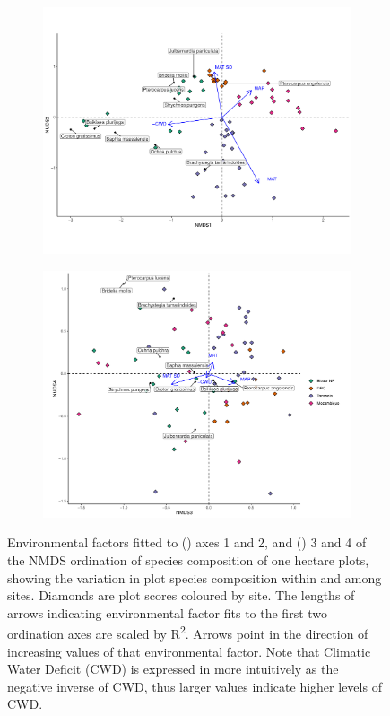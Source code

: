 \begin{refsection}
\begin{figure}
	\begin{subfigure}{0.45\linewidth}
		\includegraphics[width=\linewidth]{img/all_nmds_envfit}
		\caption{}
		\label{bicuar:nmds_envfit_12}
	\end{subfigure}
	\hfill
	\begin{subfigure}{0.45\linewidth}
		\includegraphics[width=\linewidth]{img/all_nmds_envfit_low}
		\caption{}
		\label{bicuar:nmds_envfit_34}
	\end{subfigure}
	\caption[NMDS ordination of species composition]{Environmental factors fitted to () axes 1 and 2, and () 3 and 4 of the NMDS ordination of species composition of one hectare plots, showing the variation in plot species composition within and among sites. Diamonds are plot scores coloured by site. The lengths of arrows indicating environmental factor fits to the first two ordination axes are scaled by R\textsuperscript{2}. Arrows point in the direction of increasing values of that environmental factor. Note that Climatic Water Deficit (CWD) is expressed in more intuitively as the negative inverse of CWD, thus larger values indicate higher levels of CWD.}
	\label{bicuar:nmds_envfit}
\end{figure}


\end{refsection}

